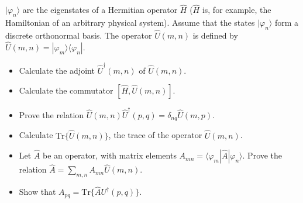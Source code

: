 \documentclass[12pt,a4paper]{article}
\newenvironment{problem}[2][Problem]{\begin{trivlist}
\item[\hskip \labelsep {\bfseries #1}\hskip \labelsep {\bfseries #2.}]}{\end{trivlist}}
\begin{document}
\begin{problem}{1}
[C-T Exercise 2-1] $|\varphi_n\rangle$ are the eigenstates of a Hermitian operator $\hat{H}$ ($\hat{H}$ is, for example, the Hamiltonian of an arbitrary physical system). Assume that the states $|\varphi_n\rangle$ form a discrete orthonormal basis. The operator $\hat{U}(m,n)$ is defined by $\hat{U}(m,n)=|\varphi_m\rangle\langle\varphi_n|$.
\begin{itemize}
\item[(a)] Calculate the adjoint $\hat{U}^{\dagger}(m,n)$ of $\hat{U}(m,n)$.
\item[(b)] Calculate the commutator $[\hat{H},\hat{U}(m,n)]$.
\item[(c)] Prove the relation $\hat{U}(m,n)\hat{U}^{\dagger}(p,q)=\delta_{nq}\hat{U}(m,p)$.
\item[(d)] Calculate $\text{Tr}\{\hat{U}(m,n)\}$, the trace of the operator $\hat{U}(m,n)$.
\item[(e)] Let $\hat{A}$ be an operator, with matrix elements $A_{mn}=\langle\varphi_m|\hat{A}|\varphi_n\rangle$. Prove the relation $\hat{A}=\sum_{m,n}A_{mn}\hat{U}(m,n)$.
\item[(f)] Show that $A_{pq}=\text{Tr}\{\hat{A}U^{\dagger}(p,q)\}$.
\end{itemize}
\end{problem}
\end{document}

